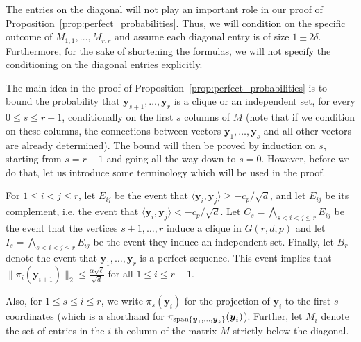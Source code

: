 \documentclass[11pt]{amsart}
\theoremstyle{definition}
\def\by{\boldsymbol{y}}
\begin{document}
The entries on the diagonal will not play an important role in our proof of Proposition~\ref{prop:perfect_probabilities}. Thus, we will condition on the specific outcome of $M_{1, 1}, \dots, M_{r, r}$ and assume each diagonal entry is of size $1\pm 2\delta$. Furthermore, for the sake of shortening the formulas, we will not specify the conditioning on the diagonal entries explicitly.

The main idea in the proof of Proposition~\ref{prop:perfect_probabilities} is to bound the probability that $\by_{s+1}, \dots, \by_r$ is a clique or an independent set, for every $0\leq s\leq r-1$, conditionally on the first $s$ columns of $M$ (note that if we condition on these columns, the connections between vectors $\by_1, \dots, \by_s$ and all other vectors are already determined). The bound will then be proved by induction on $s$, starting from $s=r-1$ and going all the way down to $s=0$. However, before we do that, let us introduce some terminology which will be used in the proof.

For $1\leq i<j\leq r$, let $E_{ij}$ be the event that $\langle \by_i, \by_j\rangle\geq -c_p/\sqrt{d}$, and let $\overline{E}_{ij}$ be its complement, i.e. the event that $\langle \by_i, \by_j\rangle< -c_p/\sqrt{d}$. Let $C_s=\bigwedge_{s< i<j\leq r} E_{ij}$ be the event that the vertices $s+1, \dots, r$ induce a clique in $G(r, d, p)$ and let $I_s=\bigwedge_{s< i<j\leq r} \overline{E}_{ij}$ be the event they induce an independent set. Finally, let $B_r$ denote the event that $\by_1, \dots, \by_r$ is a perfect sequence. This event implies that $\|\pi_i(\by_{i+1})\|_2\leq \frac{\alpha\sqrt{\ell}}{\sqrt{d}}$ for all $1\leq i\leq r-1$.

Also, for $1\leq s\leq i\leq r$, we write $\pi_s(\by_i)$ for the projection of $\by_i$ to the first $s$ coordinates (which is a shorthand for $\pi_{{\rm span}\{\by_1, \dots, \by_s\}}(\by_i)$). Further, let $M_i$ denote the set of entries in the $i$-th column of the matrix $M$ strictly below the diagonal.
\end{document}
